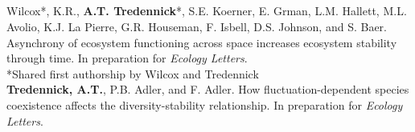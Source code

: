 \documentclass[margin,line]{resume}
\begin{document}
\begin{resume}
	\section{\textmd{\textsf{}}}
    Wilcox*, K.R., \textbf{A.T. Tredennick}*, S.E. Koerner, E. Grman, L.M. Hallett, M.L. Avolio, K.J. La Pierre, G.R. Houseman, F. Isbell, D.S. Johnson, and S. Baer. Asynchrony of ecosystem functioning across space increases ecosystem stability through time. In preparation for \emph{Ecology Letters}. \\%
    \hspace{2em} \textsf{\footnotesize{*Shared first authorship by Wilcox and Tredennick}} \vspace{-6mm}\\%
    
    \textbf{Tredennick, A.T.}, P.B. Adler, and F. Adler. How fluctuation-dependent species coexistence affects the diversity-stability relationship. In preparation for \emph{Ecology Letters}.
    
	

\end{resume}
\end{document}
